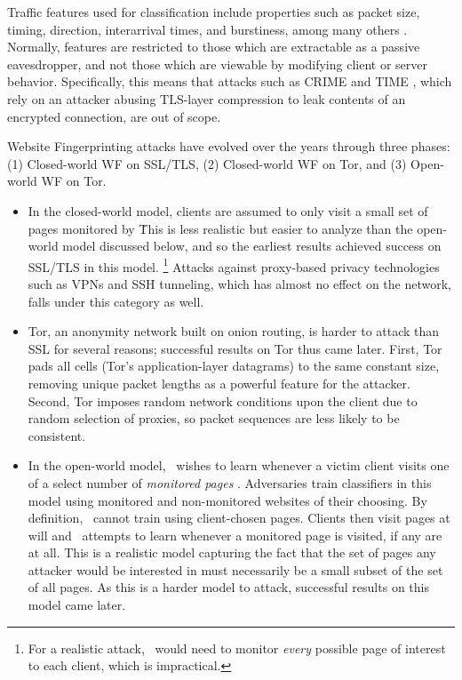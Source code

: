 \documentclass[runningheads]{llncs}
\begin{document}
Traffic features used for classification include properties such as packet size, timing,
direction, interarrival times, and burstiness, among many others \cite{wang2016website}. Normally, features
are restricted to those which are extractable as a passive eavesdropper, and not those which
are viewable by modifying client or server behavior. Specifically, this means that
attacks such as CRIME \cite{} and TIME \cite{}, which rely on an attacker abusing TLS-layer compression
to leak contents of an encrypted connection, are out of scope.

Website Fingerprinting attacks have evolved over the years through three phases:
(1) Closed-world WF on SSL/TLS, (2) Closed-world WF on Tor, and (3) Open-world WF on Tor.

\begin{itemize}
\item[(1)] In the closed-world model, clients are assumed to only visit a small set of pages monitored by \adv\.
This is less realistic but easier to analyze than the open-world model discussed below,
and so the earliest results achieved success on SSL/TLS in this model.
\footnote{For a realistic attack, \adv\ would need to
monitor \emph{every} possible page of interest to each client, which is impractical.}
Attacks against proxy-based privacy technologies such as VPNs and SSH tunneling,
which has almost no effect on the network, falls under this category as well.

\item[(2)] Tor, an anonymity network built on onion routing, is harder to attack than SSL for several reasons;
successful results on Tor thus came later.
First, Tor pads all cells (Tor's application-layer datagrams) to the same constant size,
removing unique packet lengths as a powerful feature for the attacker.
Second, Tor imposes random network conditions upon the client due to random selection of proxies,
so packet sequences are less likely to be consistent.

\item[(3)] In the open-world model, \adv\ wishes to learn whenever a victim
client visits one of a select number of \emph{monitored pages} \cite{wang2016website}. Adversaries train
classifiers in this model using monitored and non-monitored websites of their choosing. By
definition, \adv\ cannot train using client-chosen pages. Clients then visit pages at will
and \adv\ attempts to learn whenever a monitored page is visited, if any are at all.
This is a realistic model capturing the fact that the set of pages any attacker would be interested in must
necessarily be a small subset of the set of all pages.
As this is a harder model to attack, successful results on this model came later.
\end{itemize}
\end{document}

